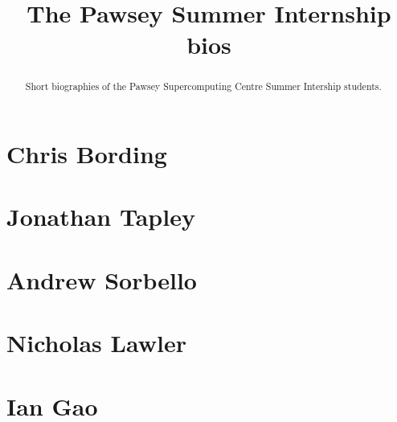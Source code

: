 \documentclass[11pt,a4paper]{report}
\title{The Pawsey Summer Internship bios}
\begin{document}
\maketitle
\tableofcontents


\begin{abstract}

Short biographies of the Pawsey Supercomputing Centre Summer Intership students.

\end{abstract}

\chapter{Chris Bording}





\chapter{Jonathan Tapley}


\chapter{Andrew Sorbello}


\chapter{Nicholas Lawler}


\chapter{Ian Gao}

\end{document}
